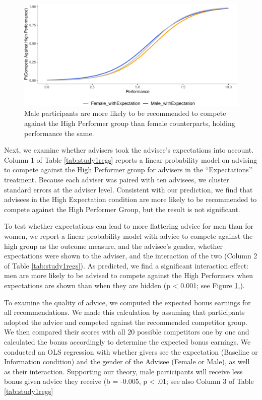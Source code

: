 \documentclass[
  man,floatsintext]{apa6}
\begin{document}
\begin{figure}

{\centering \includegraphics{Advice-Giving_files/figure-latex/study1genderdiff-1} 

}

\caption{Male participants are more likely to be recommended to compete against the High Performer group than female counterparts, holding performance the same.}\label{fig:study1genderdiff}
\end{figure}

Next, we examine whether advisers took the advisee's expectations into account. Column 1 of Table \ref{tab:study1regs} reports a linear probability model on advising to compete against the High Performer group for advisers in the ``Expectations'' treatment. Because each adviser was paired with ten advisees, we cluster standard errors at the adviser level. Consistent with our prediction, we find that advisees in the High Expectation condition are more likely to be recommended to compete against the High Performer Group, but the result is not significant.

To test whether expectations can lead to more flattering advice for men than for women, we report a linear probability model with advice to compete against the high group as the outcome measure, and the advisee's gender, whether expectations were shown to the adviser, and the interaction of the two (Column 2 of Table \ref{tab:study1regs}). As predicted, we find a significant interaction effect: men are more likely to be advised to compete against the High Performers when expectations are shown than when they are hidden (p \textless{} 0.001; see Figure \ref{fig:study1genderdiff},).

To examine the quality of advice, we computed the expected bonus earnings for all recommendations. We made this calculation by assuming that participants adopted the advice and competed against the recommended competitor group. We then compared their scores with all 20 possible competitors one by one and calculated the bonus accordingly to determine the expected bonus earnings. We conducted an OLS regression with whether givers see the expectation (Baseline or Information condition) and the gender of the Advisee (Female or Male), as well as their interaction. Supporting our theory, male participants will receive less bonus given advice they receive (b = -0.005, p \textless{} .01; see also Column 3 of Table \ref{tab:study1regs}
\end{document}
